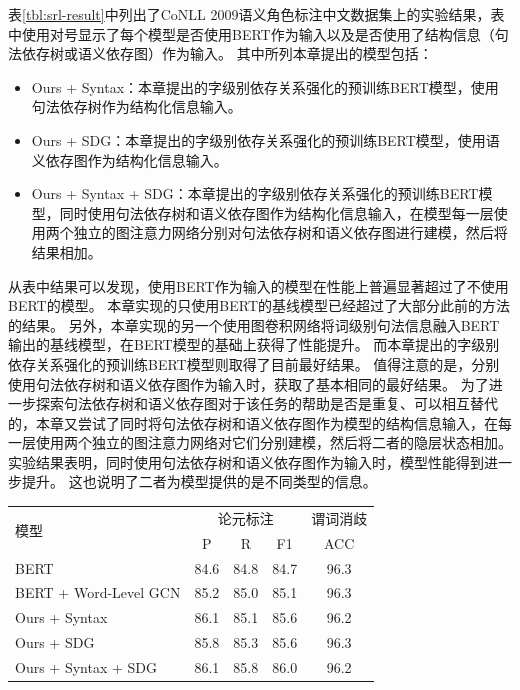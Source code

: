 表\ref{tbl:srl-result}中列出了CoNLL 2009语义角色标注中文数据集上的实验结果，表中使用对号显示了每个模型是否使用BERT作为输入以及是否使用了结构信息（句法依存树或语义依存图）作为输入。
其中所列本章提出的模型包括：
\begin{itemize}
    \item Ours + Syntax：本章提出的字级别依存关系强化的预训练BERT模型，使用句法依存树作为结构化信息输入。
    \item Ours + SDG：本章提出的字级别依存关系强化的预训练BERT模型，使用语义依存图作为结构化信息输入。
    \item Ours + Syntax + SDG：本章提出的字级别依存关系强化的预训练BERT模型，同时使用句法依存树和语义依存图作为结构化信息输入，在模型每一层使用两个独立的图注意力网络分别对句法依存树和语义依存图进行建模，然后将结果相加。
\end{itemize}

从表中结果可以发现，使用BERT作为输入的模型在性能上普遍显著超过了不使用BERT的模型。
本章实现的只使用BERT的基线模型已经超过了大部分此前的方法的结果。
另外，本章实现的另一个使用图卷积网络将词级别句法信息融入BERT输出的基线模型，在BERT模型的基础上获得了性能提升。
而本章提出的字级别依存关系强化的预训练BERT模型则取得了目前最好结果。
值得注意的是，分别使用句法依存树和语义依存图作为输入时，获取了基本相同的最好结果。
为了进一步探索句法依存树和语义依存图对于该任务的帮助是否是重复、可以相互替代的，本章又尝试了同时将句法依存树和语义依存图作为模型的结构信息输入，在每一层使用两个独立的图注意力网络对它们分别建模，然后将二者的隐层状态相加。
实验结果表明，同时使用句法依存树和语义依存图作为输入时，模型性能得到进一步提升。
这也说明了二者为模型提供的是不同类型的信息。

\begin{table}[htpb]
    \vspace{0.5em}\centering\wuhao
    \begin{tabular}{lcccc}
        \toprule[1.5pt]
        \multirow{2}{*}{模型}& \multicolumn{3}{c}{论元标注} & 谓词消歧 \\
        \cmidrule(r){2-4} \cmidrule(r){5-5}
         & P & R & F1 & ACC \\
        \midrule[1pt]
        BERT                   & 84.6 & 84.8 & 84.7 & 96.3 \\
        BERT + Word-Level GCN  & 85.2 & 85.0 & 85.1 & 96.3 \\
        Ours + Syntax          & 86.1 & 85.1 & 85.6 & 96.2  \\
        Ours + SDG             & 85.8 & 85.3 & 85.6 & 96.3 \\
        Ours + Syntax + SDG    & 86.1 & 85.8 & 86.0 & 96.2  \\
        \bottomrule[1.5pt]
    \end{tabular}
\end{table}

